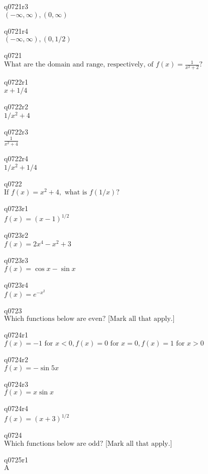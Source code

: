 q0721r3\\
\(\displaystyle (-\infty, \infty), (0, \infty) \)

q0721r4\\
\(\displaystyle (-\infty, \infty), (0, 1/2) \)

q0721\\
\(\displaystyle \text{What are the domain and range, respectively, of } f(x) = \frac{1}{x^2 + 2}? \)

q0722r1\\
\(\displaystyle x + 1/4 \)

q0722r2\\
\(\displaystyle 1/x^2 + 4 \)

q0722r3\\
\(\displaystyle \frac{1}{x^2 + 4} \)

q0722r4\\
\(\displaystyle 1/x^2 + 1/4 \)

q0722\\
\(\displaystyle \text{If } f(x) = x^2 + 4, \text{ what is } f(1/x)? \)

q0723r1\\
\(\displaystyle f(x) = (x-1)^{1/2} \)

q0723r2\\
\(\displaystyle f(x) = 2x^4 - x^2 + 3 \)

q0723r3\\
\(\displaystyle f(x) = \cos x - \sin x \)

q0723r4\\
\(\displaystyle f(x) = e^{-x^2} \)

q0723\\
\(\displaystyle \text{Which functions below are even? [Mark all that apply.]} \)

q0724r1\\
\(\displaystyle f(x) = -1 \text{ for } x < 0, f(x) = 0 \text{ for } x = 0, f(x) = 1 \text{ for } x > 0 \)

q0724r2\\
\(\displaystyle f(x) = -\sin 5x \)

q0724r3\\
\(\displaystyle f(x) = x \sin x \)

q0724r4\\
\(\displaystyle f(x) = (x+3)^{1/2} \)

q0724\\
\(\displaystyle \text{Which functions below are odd? [Mark all that apply.]} \)

q0725r1\\
\(\displaystyle \text{A} \)

